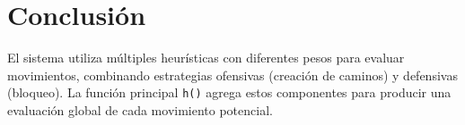 \documentclass[11pt]{article}
\begin{document}
    \section{Conclusión}
    El sistema utiliza múltiples heurísticas con diferentes pesos para evaluar movimientos, combinando estrategias ofensivas (creación de caminos) y defensivas (bloqueo). La función principal \texttt{h()} agrega estos componentes para producir una evaluación global de cada movimiento potencial.
\end{document}
